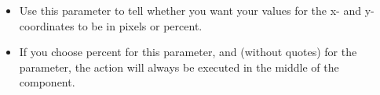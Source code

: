 \begin{itemize}
\item Use this parameter to tell \app{} whether you want your values for the x- and y-coordinates to be in pixels or percent.
\item  If you choose percent for  this parameter, and  (without quotes) for the  parameter, the action will always be executed in the middle of the component.
\end{itemize}

